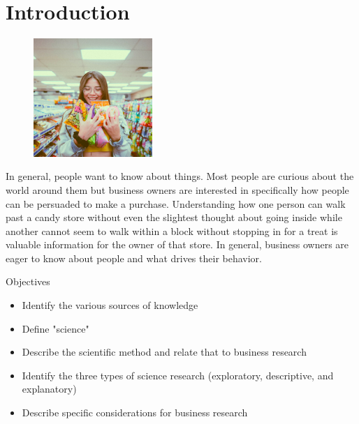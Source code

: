 \chapter{Introduction}\label{ch01:introduction}

\begin{figure}
	\label{01:fig01} 
	\centering
	\includegraphics[width=0.4\textwidth]{gfx/01-shopping} 
\end{figure}
In general, people want to know about things. Most people are curious about the world around them but business owners are interested in specifically how people can be persuaded to make a purchase. Understanding how one person can walk past a candy store without even the slightest thought about going inside while another cannot seem to walk within a block without stopping in for a treat is valuable information for the owner of that store. In general, business owners are eager to know about people and what drives their behavior.

\begin{center}
	\begin{objbox}{Objectives}
		\begin{itemize}
			\setlength{\itemsep}{0pt}
			\setlength{\parskip}{0pt}
			\setlength{\parsep}{0pt}

			\item Identify the various sources of knowledge
			\item Define "science"
			\item Describe the scientific method and relate that to business research
			\item Identify the three types of science research (exploratory, descriptive, and explanatory)
			\item Describe specific considerations for business research

		\end{itemize}
	\end{objbox}
\end{center}

